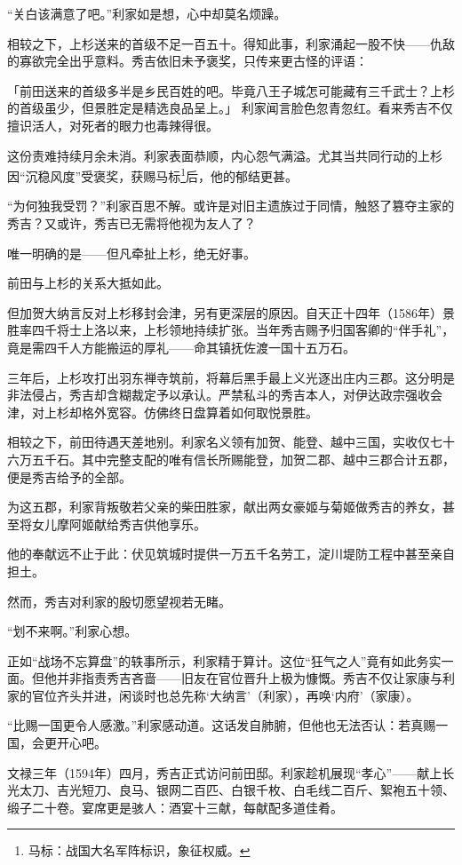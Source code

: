 \documentclass[
]{book}
\begin{document}
``关白该满意了吧。''利家如是想，心中却莫名烦躁。

相较之下，上杉送来的首级不足一百五十。得知此事，利家涌起一股不快------仇敌的寡欲完全出乎意料。秀吉依旧未予褒奖，只传来更古怪的评语：

「前田送来的首级多半是乡民百姓的吧。毕竟八王子城怎可能藏有三千武士？上杉的首级虽少，但景胜定是精选良品呈上。」
利家闻言脸色忽青忽红。看来秀吉不仅擅识活人，对死者的眼力也毒辣得很。

这份责难持续月余未消。利家表面恭顺，内心怨气满溢。尤其当共同行动的上杉因``沉稳风度''受褒奖，获赐马标\footnote{马标：战国大名军阵标识，象征权威。}后，他的郁结更甚。

``为何独我受罚？''利家百思不解。或许是对旧主遗族过于同情，触怒了篡夺主家的秀吉？又或许，秀吉已无需将他视为友人了？

唯一明确的是------但凡牵扯上杉，绝无好事。

前田与上杉的关系大抵如此。

但加贺大纳言反对上杉移封会津，另有更深层的原因。自天正十四年（1586年）景胜率四千将士上洛以来，上杉领地持续扩张。当年秀吉赐予归国客卿的``伴手礼''，竟是需四千人方能搬运的厚礼------命其镇抚佐渡一国十五万石。

三年后，上杉攻打出羽东禅寺筑前，将幕后黑手最上义光逐出庄内三郡。这分明是非法侵占，秀吉却含糊裁定予以承认。严禁私斗的秀吉本人，对伊达政宗强收会津，对上杉却格外宽容。仿佛终日盘算着如何取悦景胜。

相较之下，前田待遇天差地别。利家名义领有加贺、能登、越中三国，实收仅七十六万五千石。其中完整支配的唯有信长所赐能登，加贺二郡、越中三郡合计五郡，便是秀吉给予的全部。

为这五郡，利家背叛敬若父亲的柴田胜家，献出两女豪姬与菊姬做秀吉的养女，甚至将女儿摩阿姬献给秀吉供他享乐。

他的奉献远不止于此：伏见筑城时提供一万五千名劳工，淀川堤防工程中甚至亲自担土。

然而，秀吉对利家的殷切愿望视若无睹。

``划不来啊。''利家心想。

正如``战场不忘算盘''的轶事所示，利家精于算计。这位``狂气之人''竟有如此务实一面。但他并非指责秀吉吝啬------旧友在官位晋升上极为慷慨。秀吉不仅让家康与利家的官位齐头并进，闲谈时也总先称`大纳言'（利家），再唤`内府'（家康）。

``比赐一国更令人感激。''利家感动道。这话发自肺腑，但他也无法否认：若真赐一国，会更开心吧。

文禄三年（1594年）四月，秀吉正式访问前田邸。利家趁机展现``孝心''------献上长光太刀、吉光短刀、良马、银网二百匹、白银千枚、白毛线二百斤、絮袍五十领、缎子二十卷。宴席更是骇人：酒宴十三献，每献配多道佳肴。
\end{document}
